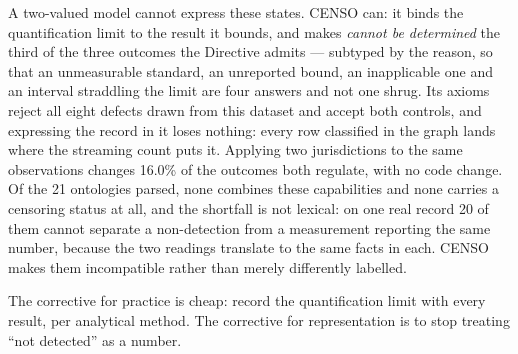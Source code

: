 A two-valued model cannot express these states. CENSO can: it binds the
quantification limit to the result it bounds, and makes \emph{cannot be
determined} the third of the three outcomes the Directive admits --- subtyped by
the reason, so that an unmeasurable standard, an unreported bound, an
inapplicable one and an interval straddling the limit are four answers and not
one shrug. Its axioms reject all eight defects drawn
from this dataset and accept both controls, and expressing the record in it
loses nothing: every row classified in the graph lands where the streaming
count puts it. Applying two jurisdictions to
the same observations changes \num{16.0}\% of the outcomes both regulate, with
no code change. Of the \num{21} ontologies parsed, none combines these
capabilities and none carries a censoring status at all, and the shortfall is
not lexical: on one real record \num{20} of them cannot separate a non-detection
from a measurement reporting the same number,
because the two readings translate to the same facts in each. CENSO makes them
incompatible rather than merely differently labelled.

The corrective for practice is cheap: record the quantification limit with every
result, per analytical method. The corrective for representation is to stop
treating ``not detected'' as a number.